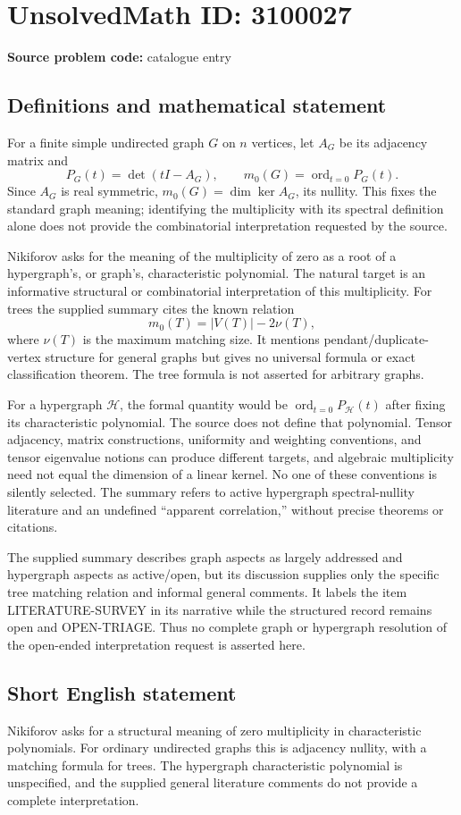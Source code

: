 \documentclass[11pt]{article}
\begin{document}
\section*{UnsolvedMath ID: 3100027}
\textbf{Source problem code:} catalogue entry
\subsection{Definitions and mathematical statement}
For a finite simple undirected graph $G$ on $n$ vertices, let $A_G$ be its adjacency matrix and
\[
P_G(t)=\det(tI-A_G),\qquad
m_0(G)=\operatorname{ord}_{t=0}P_G(t).
\]
Since $A_G$ is real symmetric, $m_0(G)=\dim\ker A_G$, its nullity. This fixes the standard graph meaning; identifying the multiplicity with its spectral definition alone does not provide the combinatorial interpretation requested by the source.

Nikiforov asks for the meaning of the multiplicity of zero as a root of a hypergraph's, or graph's, characteristic polynomial. The natural target is an informative structural or combinatorial interpretation of this multiplicity. For trees the supplied summary cites the known relation
\[
m_0(T)=|V(T)|-2\nu(T),
\]
where $\nu(T)$ is the maximum matching size. It mentions pendant/duplicate-vertex structure for general graphs but gives no universal formula or exact classification theorem. The tree formula is not asserted for arbitrary graphs.

For a hypergraph $\mathcal H$, the formal quantity would be $\operatorname{ord}_{t=0}P_{\mathcal H}(t)$ after fixing its characteristic polynomial. The source does not define that polynomial. Tensor adjacency, matrix constructions, uniformity and weighting conventions, and tensor eigenvalue notions can produce different targets, and algebraic multiplicity need not equal the dimension of a linear kernel. No one of these conventions is silently selected. The summary refers to active hypergraph spectral-nullity literature and an undefined ``apparent correlation,'' without precise theorems or citations.

The supplied summary describes graph aspects as largely addressed and hypergraph aspects as active/open, but its discussion supplies only the specific tree matching relation and informal general comments. It labels the item LITERATURE-SURVEY in its narrative while the structured record remains open and OPEN-TRIAGE. Thus no complete graph or hypergraph resolution of the open-ended interpretation request is asserted here.
\subsection{Short English statement}
Nikiforov asks for a structural meaning of zero multiplicity in characteristic polynomials. For ordinary undirected graphs this is adjacency nullity, with a matching formula for trees. The hypergraph characteristic polynomial is unspecified, and the supplied general literature comments do not provide a complete interpretation.
\end{document}
